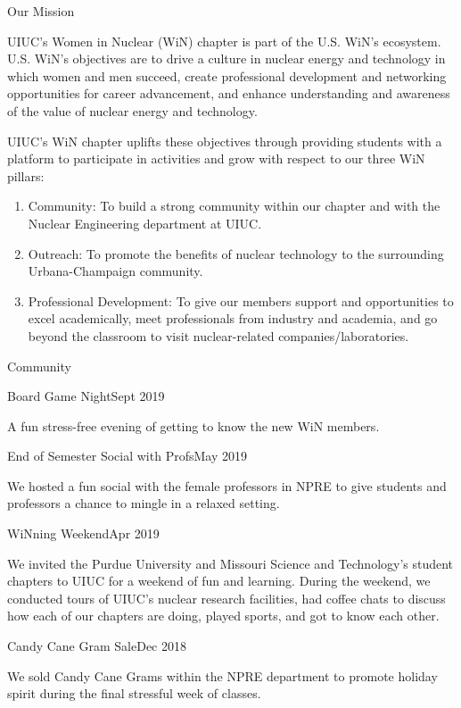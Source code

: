 \documentclass{resume2} %
\begin{document}
\begin{rSection}{Our Mission}
\raggedright
UIUC's Women in Nuclear (WiN) chapter is part of the 
U.S. WiN's ecosystem. U.S. WiN's objectives are to 
drive a culture in nuclear energy and technology 
in which women and men succeed, create professional development 
and networking opportunities for career advancement, and enhance understanding 
and awareness of the value of nuclear energy and technology.

UIUC's WiN chapter uplifts these objectives through 
providing students with a platform to participate 
in activities and grow with respect to our three WiN 
pillars: 

\begin{enumerate}
	\item Community: To build a strong community within our chapter and 
	with the Nuclear Engineering department at UIUC. 
	\item Outreach: To promote the benefits of nuclear technology to the surrounding 
	Urbana-Champaign community. 
	\item Professional Development: To give our members support and opportunities to excel 
	academically, meet professionals from industry and academia, and go beyond the classroom 
	to visit nuclear-related companies/laboratories. 
\end{enumerate}

\end{rSection}

\begin{rSection}{Community}
	\begin{rSubsection}{Board Game Night}{Sept 2019}{}{}
		\item A fun stress-free evening of getting to know the new WiN members.
	\end{rSubsection}
	\begin{rSubsection}{End of Semester Social with Profs}{May 2019}{}{}
		\item We hosted a fun social with the female professors in NPRE to 
		give students and professors a chance to mingle in a relaxed setting. 
	\end{rSubsection}
	\begin{rSubsection}{WiNning Weekend}{Apr 2019}{}{}
		\item We invited the Purdue University and Missouri Science and Technology's 
		student chapters to UIUC for a weekend of fun and learning. 
		During the weekend, we conducted tours of UIUC's nuclear research facilities, 
		had coffee chats to discuss how each of our chapters are doing, played sports, 
		and got to know each other. 
	\end{rSubsection}
	\begin{rSubsection}{Candy Cane Gram Sale}{Dec 2018}{}{}
		\item We sold Candy Cane Grams within the NPRE department to promote holiday spirit 
		during the final stressful week of classes. 
	\end{rSubsection}
\end{rSection}
\end{document}
